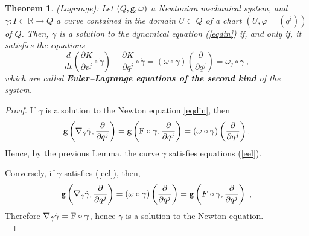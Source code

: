 \documentclass[12pt]{report}
\newtheorem{teor}{Theorem}[chapter]
\def\beq{\begin{equation}}
\def\eeq{\end{equation}}
\def\derpar#1#2{\frac{\partial{#1}}{\partial{#2}}}
\def\qed{\ifvmode\removelastskip\fi
{\unskip\nobreak\hfil\penalty50\hbox{}\nobreak\hfil
\hbox{\vrule height1.2ex width1.2ex}\parfillskip=0pt
\finalhyphendemerits=0 \par\smallskip}}
\def\Real{\mathbb{R}}
\begin{document}
\begin{teor}
{\rm (Lagrange)}:
Let $(Q,{\tt g},\omega)$ a Newtonian mechanical system, and
$\gamma\colon I\subset\Real\to Q$ a curve contained in the domain $U\subset Q$ of a chart
$(U,\varphi=(q^i))$ of $Q$. Then, $\gamma$ is a solution to the dynamical equation
(\ref{eqdin}) if, and only if, it satisfies the equations 
\beq
\frac{d}{d t}\left(\derpar{K}{v^j}\circ\dot\gamma\right)-
\derpar{K}{q^j}\circ\dot\gamma=
(\omega\circ\gamma)\left(\derpar{}{q^j}\right)=\omega_j \circ\gamma \ ,
\label{eel}
\eeq
which are called \textbf{Euler--Lagrange equations of the second kind}
of the system.
\end{teor}
\begin{proof}
If $\gamma$ is a solution to the Newton equation \eqref{eqdin}, then
$$
{\tt g}\left(\nabla_{\dot\gamma}\dot\gamma,\derpar{}{q^j}\right)=
{\tt g}\left({\rm F}\circ\gamma,\derpar{}{q^j}\right)=
(\omega\circ\gamma)\left(\derpar{}{q^j}\right).
$$
Hence, by the previous Lemma, the curve $\gamma$ satisfies equations (\ref{eel}).

Conversely, if $\gamma$ satisfies (\ref{eel}), then,
$$
{\tt g}\left(\nabla_{\dot\gamma}\dot\gamma,\derpar{}{q^j}\right)=
(\omega\circ\gamma)\left(\derpar{}{q^j}\right)={\tt g}\left(F\circ\gamma,\derpar{}{q^j}\right) \ ,
$$
Therefore $\nabla_{\dot\gamma}\dot\gamma={\rm F}\circ\gamma$,
 hence $\gamma$ is a solution to the Newton equation.
\\ \qed \end{proof}
\end{document}
